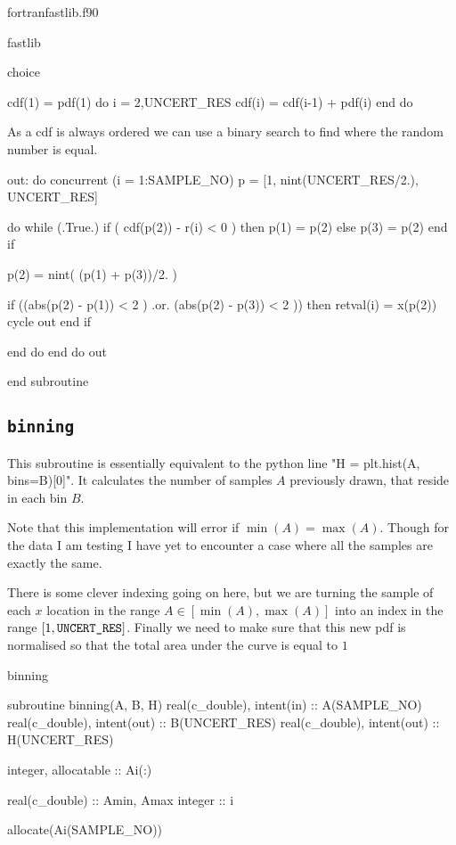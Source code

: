 \documentclass[10pt, a4paper]{article}
\begin{document}
\begin{subfile}{fortran}{fastlib.f90}
\begin{codeblock}[noref]{fastlib}
\begin{codeblock}{choice}
\begin{code}
	cdf(1) = pdf(1)
	do i = 2,UNCERT_RES
		cdf(i) = cdf(i-1) + pdf(i)
	end do
\end{code}

As a cdf is always ordered we can use a binary search to find where the random number is equal.

\begin{code}
	out: do concurrent (i = 1:SAMPLE_NO)
		p = [1, nint(UNCERT_RES/2.), UNCERT_RES]
		
		do while (.True.)
			if ( cdf(p(2)) - r(i) < 0 ) then 
				p(1) = p(2)
			else
				p(3) = p(2)
			end if 
			
			p(2) = nint( (p(1) + p(3))/2. )
			
			if ((abs(p(2) - p(1)) < 2 ) .or. (abs(p(2) - p(3)) < 2 )) then 
				retval(i) = x(p(2))
				cycle out
			end if 
			
		end do 
	end do out
	
end subroutine
\end{code}
\end{codeblock}

\subsection{\texttt{binning}}
This subroutine is essentially equivalent to the python line "H = plt.hist(A, bins=B)[0]".
It calculates the number of samples $A$ previously drawn, that reside in each bin $B$. 

Note that this implementation will error if $\min(A) = \max(A)$. 
Though for the data I am testing I have yet to encounter a case where all the samples are exactly the same. 

There is some clever indexing going on here, but we are turning the sample of each $x$ location in the range $A \in [\min(A), \max(A)]$ into an index in the range $[1, \text{\texttt{UNCERT\_RES}}]$. Finally we need to make sure that this new pdf is normalised so that the total area under the curve is equal to $1$

\begin{codeblock}{binning}
\begin{code}
subroutine binning(A, B, H) 
	real(c_double), intent(in)  :: A(SAMPLE_NO)
	real(c_double), intent(out) :: B(UNCERT_RES)
	real(c_double), intent(out) :: H(UNCERT_RES)
	
	integer, allocatable :: Ai(:)
	
	real(c_double) :: Amin, Amax
	integer :: i
	
	allocate(Ai(SAMPLE_NO))
	

\end{code}
\end{codeblock}
\end{codeblock}
\end{subfile}
\end{document}
